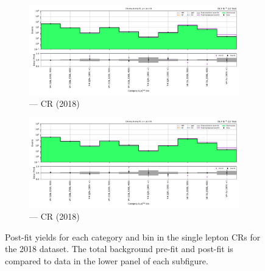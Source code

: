 \begin{figure}[htbp]
    \centering
    \begin{subfigure}[b]{\textwidth}
        \includegraphics[width=\textwidth]{chapters/higgstoinv/figures/mountain_ranges/2018/VH/Wmunu_tree_fit_b-abs_values_VH_cats.pdf}
        \caption{\VH --- \singleMuCr \gls{CR} (2018)}
    \end{subfigure}

    \begin{subfigure}[b]{\textwidth}
        \includegraphics[width=\textwidth]{chapters/higgstoinv/figures/mountain_ranges/2018/VH/Wenu_tree_fit_b-abs_values_VH_cats.pdf}
        \caption{\VH --- \singleEleCr \gls{CR} (2018)}
    \end{subfigure}
    \caption[Post-fit yields for each \VH category and \ptmiss bin in the single lepton control regions for the 2018 dataset]{Post-fit yields for each \VH category and \ptmiss bin in the single lepton \glspl{CR} for the 2018 dataset. The total background pre-fit and post-fit is compared to data in the lower panel of each subfigure.}
    \label{fig:htoinv_mountain_range_VH_2018_single_lep_CRs}
\end{figure}

